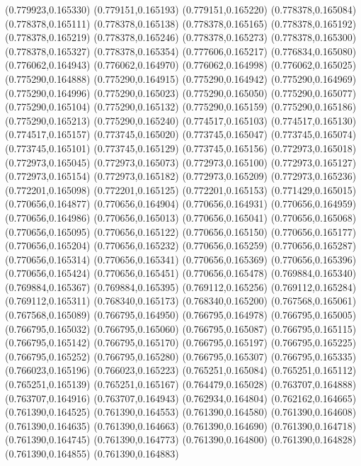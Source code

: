 (0.779923,0.165330)
(0.779151,0.165193)
(0.779151,0.165220)
(0.778378,0.165084)
(0.778378,0.165111)
(0.778378,0.165138)
(0.778378,0.165165)
(0.778378,0.165192)
(0.778378,0.165219)
(0.778378,0.165246)
(0.778378,0.165273)
(0.778378,0.165300)
(0.778378,0.165327)
(0.778378,0.165354)
(0.777606,0.165217)
(0.776834,0.165080)
(0.776062,0.164943)
(0.776062,0.164970)
(0.776062,0.164998)
(0.776062,0.165025)
(0.775290,0.164888)
(0.775290,0.164915)
(0.775290,0.164942)
(0.775290,0.164969)
(0.775290,0.164996)
(0.775290,0.165023)
(0.775290,0.165050)
(0.775290,0.165077)
(0.775290,0.165104)
(0.775290,0.165132)
(0.775290,0.165159)
(0.775290,0.165186)
(0.775290,0.165213)
(0.775290,0.165240)
(0.774517,0.165103)
(0.774517,0.165130)
(0.774517,0.165157)
(0.773745,0.165020)
(0.773745,0.165047)
(0.773745,0.165074)
(0.773745,0.165101)
(0.773745,0.165129)
(0.773745,0.165156)
(0.772973,0.165018)
(0.772973,0.165045)
(0.772973,0.165073)
(0.772973,0.165100)
(0.772973,0.165127)
(0.772973,0.165154)
(0.772973,0.165182)
(0.772973,0.165209)
(0.772973,0.165236)
(0.772201,0.165098)
(0.772201,0.165125)
(0.772201,0.165153)
(0.771429,0.165015)
(0.770656,0.164877)
(0.770656,0.164904)
(0.770656,0.164931)
(0.770656,0.164959)
(0.770656,0.164986)
(0.770656,0.165013)
(0.770656,0.165041)
(0.770656,0.165068)
(0.770656,0.165095)
(0.770656,0.165122)
(0.770656,0.165150)
(0.770656,0.165177)
(0.770656,0.165204)
(0.770656,0.165232)
(0.770656,0.165259)
(0.770656,0.165287)
(0.770656,0.165314)
(0.770656,0.165341)
(0.770656,0.165369)
(0.770656,0.165396)
(0.770656,0.165424)
(0.770656,0.165451)
(0.770656,0.165478)
(0.769884,0.165340)
(0.769884,0.165367)
(0.769884,0.165395)
(0.769112,0.165256)
(0.769112,0.165284)
(0.769112,0.165311)
(0.768340,0.165173)
(0.768340,0.165200)
(0.767568,0.165061)
(0.767568,0.165089)
(0.766795,0.164950)
(0.766795,0.164978)
(0.766795,0.165005)
(0.766795,0.165032)
(0.766795,0.165060)
(0.766795,0.165087)
(0.766795,0.165115)
(0.766795,0.165142)
(0.766795,0.165170)
(0.766795,0.165197)
(0.766795,0.165225)
(0.766795,0.165252)
(0.766795,0.165280)
(0.766795,0.165307)
(0.766795,0.165335)
(0.766023,0.165196)
(0.766023,0.165223)
(0.765251,0.165084)
(0.765251,0.165112)
(0.765251,0.165139)
(0.765251,0.165167)
(0.764479,0.165028)
(0.763707,0.164888)
(0.763707,0.164916)
(0.763707,0.164943)
(0.762934,0.164804)
(0.762162,0.164665)
(0.761390,0.164525)
(0.761390,0.164553)
(0.761390,0.164580)
(0.761390,0.164608)
(0.761390,0.164635)
(0.761390,0.164663)
(0.761390,0.164690)
(0.761390,0.164718)
(0.761390,0.164745)
(0.761390,0.164773)
(0.761390,0.164800)
(0.761390,0.164828)
(0.761390,0.164855)
(0.761390,0.164883)
